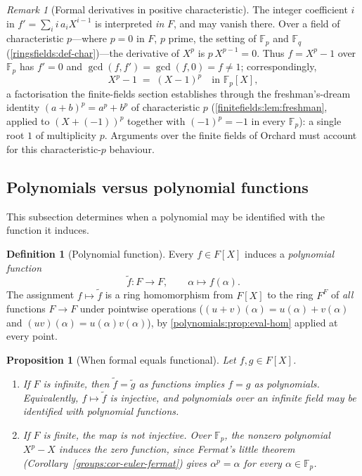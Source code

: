 \documentclass[11pt,a4paper]{article}
\newtheorem{proposition}[theorem]{Proposition}
\theoremstyle{definition}
\newtheorem{definition}[theorem]{Definition}
\theoremstyle{remark}
\newtheorem{remark}[theorem]{Remark}
\newcommand{\Fp}{\ensuremath{\mathbb{F}_{p}}}
\newcommand{\Fq}{\ensuremath{\mathbb{F}_{q}}}
\begin{document}
\begin{remark}[Formal derivatives in positive characteristic]
\label{polynomials:rem:char-p}
The integer coefficient \(i\) in \(f' = \sum_i i\, a_i X^{i-1}\) is
interpreted \emph{in} \(F\), and may vanish there. Over a field of
characteristic \(p\)---where \(p = 0\) in \(F\), \(p\) prime, the
setting of \(\Fp\) and \(\Fq\)
(\cref{ringsfields:def-char})---the derivative of \(X^p\) is
\(p\, X^{p-1} = 0\). Thus \(f = X^p - 1\) over \(\Fp\) has \(f' = 0\)
and \(\gcd(f, f') = \gcd(f, 0) = f \neq 1\); correspondingly,
\[
X^p - 1 \;=\; (X - 1)^p \quad\text{in } \Fp[X],
\]
a factorisation the finite-fields section establishes through the
freshman's-dream identity \((a+b)^p = a^p + b^p\) of characteristic
\(p\) (\cref{finitefields:lem:freshman}, applied to \((X + (-1))^p\)
together with \((-1)^p = -1\) in every \(\Fp\)): a single root \(1\)
of multiplicity \(p\). Arguments over the finite fields of Orchard must
account for this characteristic-\(p\) behaviour.
\end{remark}
\subsection{Polynomials versus polynomial functions}
\label{polynomials:sub:formalfn}

This subsection determines when a polynomial may be identified with the
function it induces.

\begin{definition}[Polynomial function]\label{polynomials:def:polyfn}
Every \(f \in F[X]\) induces a \emph{polynomial function}
\[
\tilde{f}\colon F \to F,
\qquad
\alpha \longmapsto f(\alpha).
\]
The assignment \(f \mapsto \tilde{f}\) is a ring homomorphism from
\(F[X]\) to the ring \(F^F\) of \emph{all} functions \(F \to F\) under
pointwise operations
(\((u+v)(\alpha) = u(\alpha) + v(\alpha)\) and
\((uv)(\alpha) = u(\alpha)v(\alpha)\)), by
\cref{polynomials:prop:eval-hom} applied at every point.
\end{definition}

\begin{proposition}[When formal equals functional]
\label{polynomials:prop:formal-vs-fn}
Let \(f, g \in F[X]\).
\begin{enumerate}
\item If \(F\) is infinite, then \(\tilde{f} = \tilde{g}\) as functions
  implies \(f = g\) as polynomials. Equivalently,
  \(f \mapsto \tilde{f}\) is injective, and polynomials over an
  infinite field may be identified with polynomial functions.
\item If \(F\) is finite, the map is \emph{not} injective. Over
  \(\Fp\), the nonzero polynomial \(X^p - X\) induces the zero
  function, since Fermat's little theorem
  (Corollary~\ref{groups:cor-euler-fermat}) gives
  \(\alpha^p = \alpha\) for every \(\alpha \in \Fp\).
\end{enumerate}
\end{proposition}
\end{document}
